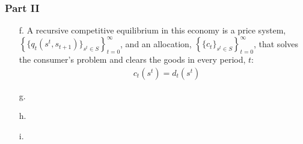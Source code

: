 \documentclass{article}
\begin{document}
\subsubsection*{Part II}
\begin{itemize}
	\item[f.] A recursive competitive equilibrium in this economy is a price system, ${\left\{\{q_t(s^t,s_{t+1})\}_{s^t\in S}\right\}_{t=0}^\infty}$, and an allocation, ${\left\{\{c_t\}_{s^t\in S}\right\}_{t=0}^\infty}$, that solves the consumer's problem and clears the goods in every period, $t$:
		\begin{align*} &c_t(s^t) = d_t(s^t)  \end{align*}
	
	\item[g.] 
	
	\item[h.] 
	
	\item[i.] 
	
\end{itemize}


\end{document}
